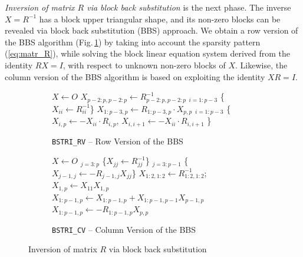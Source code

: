 \documentclass{llncs}
\begin{document}
\textit%
{Inversion of matrix $R$ via block back substitution} \label{sec:BSTRI}
is the next phase.
The inverse $X = R^{-1}$ has a block upper triangular shape,
and its non-zero blocks can be revealed 
via block back substitution (BBS) approach.
We obtain a row version of the BBS algorithm (Fig.\,\ref{alg:BSTRI_RV})
by taking into account the sparsity pattern (\ref{eq:matr_R}),
while solving the block linear equation system derived from the identity $R X = I$,
with respect to unknown non-zero blocks of $X$.
Likewise, 
the column version of the BBS algorithm is based on exploiting the identity $X R = I$.
\begin{figure}[t]%
  \centering
  \begin{subfigure}[t]{0.45\linewidth}%
    \begin{algorithm}[H]

      \BlankLine

      $X \gets O$\; 
      $X_{p-2:p,p-2:p}\gets R_{p-2:p,p-2:p}^{-1}$\;
      \Batched$_{i = 1:p-3}$ \{$X_{ii}\gets R_{ii}^{-1}$\} \;
      $X_{1:p-3,p}\gets R_{1:p-3,p}\cdot X_{p,p} $ \;
      \Batched$_{i = 1:p-3}$ \{$X_{i,p}\gets -X_{ii} \cdot R_{i,p}$, $X_{i,i+1}\gets -X_{ii} \cdot R_{i,i+1}$ \} \;
    \end{algorithm}    
    \caption{{\tt BSTRI\_RV} -- Row Version of the BBS
      \label{alg:BSTRI_RV}}
  \end{subfigure}
  \hfill
  \begin{subfigure}[t]{0.54\linewidth}%
    \begin{algorithm}[H]

      \BlankLine

      $X \gets O$\; 
      \Batched$_{j = 3:p}$ \{$X_{jj}\gets R_{jj}^{-1}$\}\;
      \Batched$_{j = 3:p-1}$ \{$X_{j-1,j}\gets -R_{j-1,j} X_{jj} $\}\;
      $X_{1:2,1:2}\gets R_{1:2,1:2}^{-1}$; $X_{1,p}\gets X_{11} X_{1,p} $\;
      $X_{1:p-1,p}\gets X_{1:p-1,p} + X_{1:p-1,p-1} X_{p-1,p}$\;
      $X_{1:p-1,p}\gets -R_{1:p-1,p} X_{p,p} $\;%
    \end{algorithm}    
    \caption{{\tt BSTRI\_CV} -- Column Version of the BBS
      \label{alg:BSTRI_CV}}
  \end{subfigure}
  \caption[]{Inversion of matrix $R$ via block back substitution\footnotemark
    \label{alg:BSTRI}}
\end{figure}
\end{document}
